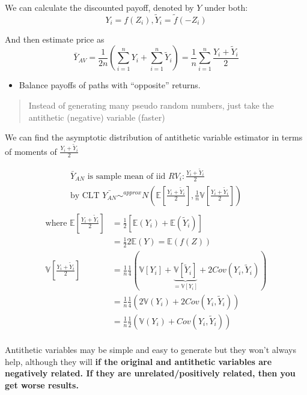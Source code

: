 \documentclass[
  oneside]{book}
\providecommand{\tightlist}{%
  \setlength{\itemsep}{0pt}\setlength{\parskip}{0pt}}
\begin{document}
We can calculate the discounted payoff, denoted by \(Y\) under both:
\[
Y_{i} = f(Z_{i}), \tilde{Y}_{i} = \tilde{f}(-Z_{i})
\]

And then estimate price as
\[
\bar{Y}_{AV} = \frac{1}{2n} \left( \sum^{n}_{i=1}Y_{i} + \sum^{n}_{i=1}\tilde{Y}_{i} \right) = \frac{1}{n}\sum^{n}_{i=1} \frac{Y_{i}+\tilde{Y}_{i}}{2}
\]

\begin{itemize}
\tightlist
\item
  Balance payoffs of paths with ``opposite'' returns.
\end{itemize}

\begin{quote}
Instead of generating many pseudo random numbers, just take the antithetic (negative) variable (faster)
\end{quote}

We can find the asymptotic distribution of antithetic variable estimator in terms of moments of \(\frac{Y_{i}+\tilde{Y}_{i}}{2}\)

\[
\begin{gathered}
\bar{Y}_{AN} \text{ is sample mean of iid } RV_i:\frac{Y_{i}+\tilde{Y}_{i}}{2}\\
\text{by CLT } \bar{Y_{AN}} \sim^{approx} N\left( \mathbb{E}\left[ \frac{Y_{i}+\tilde{Y}_{i}}{2} \right], \frac{1}{n} \mathbb{V}\left[ \frac{Y_{i}+\tilde{Y}_{i}}{2} \right] \right)\\
\end{gathered}
\]
\[
\begin{aligned}
\text{where } \mathbb{E}\left[ \frac{Y_{i}+\tilde{Y}_{i}}{2} \right] &= \frac{1}{2}\left[ \mathbb{E}(Y_{i})+ \mathbb{E}(\tilde{Y}_{i}) \right] \\
&= \frac{1}{2} 2 \mathbb{E}(Y) = \mathbb{E}\left(f(Z) \right) \\
\mathbb{V}\left[ \frac{Y_{i}+\tilde{Y}_{i}}{2} \right] &= \frac{1}{n} \frac{1}{4}\left( \mathbb{V}[Y_{i}] + \underbrace{ \mathbb{V}[\tilde{Y}_{i}] }_{ =\mathbb{V}[Y_{i}] } + 2Cov(Y_{i},\tilde{Y}_{i})\right)\\
&= \frac{1}{n} \frac{1}{4} \left( 2\mathbb{V}(Y_{i}) + 2 Cov(Y_{i}, \tilde{Y}_{i}) \right)\\
&= \frac{1}{n} \frac{1}{2} \left( \mathbb{V}(Y_{i}) + Cov(Y_{i}, \tilde{Y}_{i}) \right)\\
\end{aligned}
\]

Antithetic variables may be simple and easy to generate but they won't always help, although they will \textbf{if the original and antithetic variables are negatively related. If they are unrelated/positively related, then you get worse results.}
\end{document}
